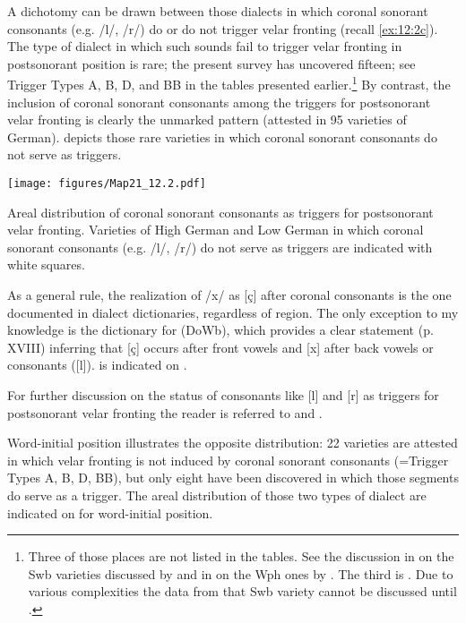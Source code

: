 A dichotomy can be drawn between those dialects in which coronal sonorant consonants (e.g. /l/, /r/) do or do not trigger velar fronting (recall \ref{ex:12:2c}). The type of dialect  in which such sounds fail to trigger velar fronting in postsonorant position is rare; the present survey has uncovered fifteen; see Trigger Types A, B, D, and BB in the tables presented earlier.\footnote{{Three of those places are not listed in the tables. See the discussion in  on the Swb varieties discussed by \citet{Haag1898} and in   on the Wph ones by \citet{Schulte1941}. The third is  \citep{Müller1911}. Due to various complexities the data from that Swb variety cannot be discussed until .}} By contrast, the inclusion of coronal sonorant consonants among the triggers for postsonorant velar fronting is clearly the unmarked pattern (attested in 95 varieties of German).  depicts those rare varieties in which coronal sonorant consonants do not serve as triggers.

\begin{map}[p]
\texttt{[image: figures/Map21\_12.2.pdf]}
\caption[Areal distribution of coronal sonorant consonants as triggers for postsonorant velar fronting]{Areal distribution of coronal sonorant consonants as triggers for postsonorant velar fronting. Varieties of High German and Low German in which coronal sonorant consonants (e.g. /l/, /r/) do not serve as triggers are indicated with white squares.}
\label{map:12:21}\label{map:21}
\end{map}

As a general rule, the realization of /x/ as [ç] after coronal consonants is the one documented in dialect dictionaries, regardless of region. The only exception to my knowledge is the dictionary for  (DoWb), which provides a clear statement (p. XVIII) inferring that [ç] occurs after front vowels and [x] after back vowels or consonants ([l]).  is indicated on .

For further discussion on the status of consonants like [l] and [r] as triggers for postsonorant velar fronting the reader is referred to  and .

Word-initial position illustrates the opposite distribution: 22 varieties are attested in which velar fronting is not induced by coronal sonorant consonants (=Trigger Types A, B, D, BB), but only eight have been discovered in which those segments do serve as a trigger. The areal distribution of those two types of dialect are indicated on  for word-initial position.

